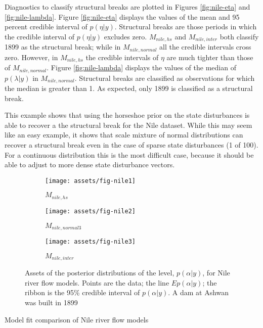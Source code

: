 \documentclass{article}
\begin{document}
Diagnostics to classify structural breaks are plotted in Figures \ref{fig:nile-eta} and \ref{fig:nile-lambda}.
Figure \ref{fig:nile-eta} displays the values of the mean and 95 percent credible interval of $p(\eta | y)$.
Structural breaks are those periods in which the credible interval of $p(\eta | y)$ excludes zero.
$M_{nile,hs}$ and $M_{nile,inter}$ both classify 1899 as the structural break; while in $M_{nile,normal}$ all the credible intervals cross zero.
However, in $M_{nile,hs}$ the credible intervals of $\eta$ are much tighter than those of $M_{nile,normal}$.
Figure \ref{fig:nile-lambda} displays the values of the median of $p(\lambda | y)$ in $M_{nile,normal}$.
Structural breaks are classified as observations for which the median is greater than 1.
As expected, only 1899 is classified as a structural break.

This example shows that using the horseshoe prior on the state disturbances is able to recover a the structural break for the Nile dataset.
While this may seem like an easy example, it shows that scale mixture of normal distributions can recover a structural break even in the case of sparse state disturbances (1 of 100).
For a continuous distribution this is the most difficult case, because it should be able to adjust to more dense state disturbance vectors.

\begin{figure}[htpb]
  \centering
  \begin{subfigure}{1.0\textwidth}
    \texttt{[image: assets/fig-nile1]}
    \caption{$M_{nile,hs}$}
    \label{fig:nile-posterior-1}    
  \end{subfigure}
  \begin{subfigure}{1.0\textwidth}
    \texttt{[image: assets/fig-nile2]}
    \caption{$M_{nile,normal3}$}
    \label{fig:nile-posterior-2}
  \end{subfigure}
  \begin{subfigure}{1.0\textwidth}
    \texttt{[image: assets/fig-nile3]}
    \caption{$M_{nile,inter}$}
    \label{fig:nile-posterior-3}
  \end{subfigure}
  \caption{Assets of the posterior distributions of the level, $p(\alpha | y)$, for Nile river flow models. Points are the data; the line $E p(\alpha | y)$; the ribbon is the 95\% credible interval of $p(\alpha | y)$. A dam at Ashwan was built in 1899}
  \label{fig:nile-posterior}
\end{figure}

\begin{table}[htpb]
  \centering
  
  \caption{Model fit comparison of Nile river flow models}
  \label{tab:nile-fits}
\end{table}
\end{document}
